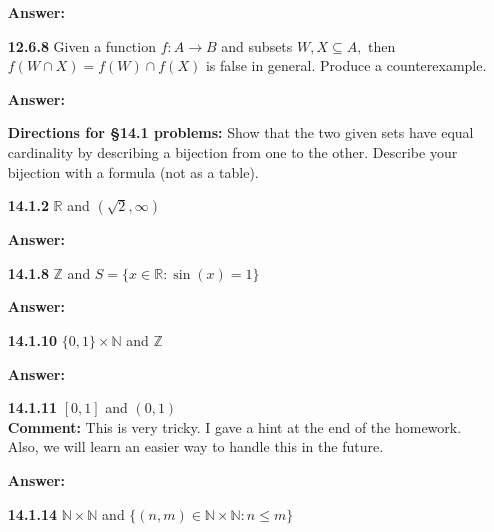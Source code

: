 \documentclass[11pt]{report}
\theoremstyle{plain}
\newcommand{\Z}{\mathbb{Z}}
\newcommand{\R}{\mathbb{R}}
\newcommand{\N}{\mathbb{N}}
\begin{document}
\begin{enumerate}
\textbf{Answer:} \\

\vspace{1in}

\item[\textbf{12.6.8}] Given a function $f : A \to B$ and subsets $W, X \subseteq A,$ then $f (W \cap  X) = f (W) \cap f (X)$ is false in general. Produce a counterexample.

\textbf{Answer:} \\

\vspace{1in}

\textbf{Directions for \S 14.1 problems:} Show that the two given sets have equal cardinality by describing a bijection
from one to the other. Describe your bijection with a formula (not as a table).\\
\item[\textbf{14.1.2}] $\R$ and $(\sqrt{2},\infty)$

\textbf{Answer:} \\

\vspace{1in}

\item[\textbf{14.1.8}] $\Z$ and $S=\{x \in \R : \sin(x)=1\}$

\textbf{Answer:} \\

\vspace{1in}

\item[\textbf{14.1.10}] $\{0,1\} \times \N$ and $\Z$

\textbf{Answer:} \\

\vspace{1in}

\item[\textbf{14.1.11}] $[0,1]$ and $(0,1)$\\

\textbf{Comment:} This is very tricky. I gave a hint at the end of the homework. Also, we will learn an easier way to handle this in the future.

\textbf{Answer:} \\

\vspace{1in}

\item[\textbf{14.1.14}]  $\N \times \N$ and $\{(n,m) \in \N \times \N : n \leq m\}$


\end{enumerate}
\end{document}
